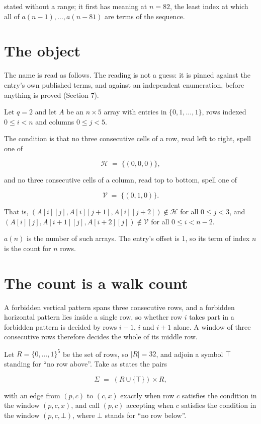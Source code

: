 \documentclass[11pt]{article}
\theoremstyle{definition}
\begin{document}
stated without a range; it first has meaning at $n = 82$, the least index at which all of $a(n-1),\dots,a(n-81)$ are terms of the sequence.

\section{The object}

The name is read as follows. The reading is not a guess: it is pinned against the entry's own published terms, and against an independent enumeration, before anything is proved (Section 7).

Let $q = 2$ and let $A$ be an $n \times 5$ array with entries in $\{0,1,\dots,1\}$, rows indexed $0 \le i < n$ and columns $0 \le j < 5$.

The condition is that no three consecutive cells of a row, read left to right, spell one of

\[\mathcal{H} \;=\; \{(0,0,0)\},\]

and no three consecutive cells of a column, read top to bottom, spell one of

\[\mathcal{V} \;=\; \{(0,1,0)\}.\]

That is, $(A[i][j],A[i][j{+}1],A[i][j{+}2]) \notin \mathcal{H}$ for all $0 \le j < 3$, and $(A[i][j],A[i{+}1][j],A[i{+}2][j]) \notin \mathcal{V}$ for all $0 \le i < n-2$.

$a(n)$ is the number of such arrays. The entry's offset is 1, so its term of index $n$ is the count for $n$ rows.

\section{The count is a walk count}

A forbidden vertical pattern spans three consecutive rows, and a forbidden horizontal pattern lies inside a single row, so whether row $i$ takes part in a forbidden pattern is decided by rows $i-1$, $i$ and $i+1$ alone. A window of three consecutive rows therefore decides the whole of its middle row.

Let $R = \{0,\dots,1\}^{5}$ be the set of rows, so $|R| = 32$, and adjoin a symbol $\top$ standing for ``no row above''. Take as states the pairs

\[\Sigma \;=\; (R \cup \{\top\}) \times R,\]

with an edge from $(p,c)$ to $(c,x)$ exactly when row $c$ satisfies the condition in the window $(p,c,x)$, and call $(p,c)$ accepting when $c$ satisfies the condition in the window $(p,c,\bot)$, where $\bot$ stands for ``no row below''.
\end{document}
